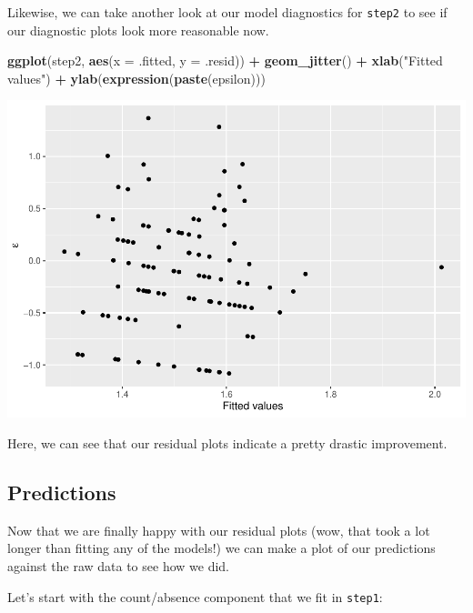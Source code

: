 \documentclass[
]{book}
\newenvironment{Shaded}{\begin{snugshade}}{\end{snugshade}}
\newcommand{\DataTypeTok}[1]{\textcolor[rgb]{0.13,0.29,0.53}{#1}}
\newcommand{\KeywordTok}[1]{\textcolor[rgb]{0.13,0.29,0.53}{\textbf{#1}}}
\newcommand{\NormalTok}[1]{#1}
\newcommand{\OperatorTok}[1]{\textcolor[rgb]{0.81,0.36,0.00}{\textbf{#1}}}
\newcommand{\StringTok}[1]{\textcolor[rgb]{0.31,0.60,0.02}{#1}}
\begin{document}
Likewise, we can take another look at our model diagnostics for \texttt{step2} to see if our diagnostic plots look more reasonable now.

\begin{Shaded}
\begin{Highlighting}[]
\KeywordTok{ggplot}\NormalTok{(step2, }\KeywordTok{aes}\NormalTok{(}\DataTypeTok{x =}\NormalTok{ .fitted, }\DataTypeTok{y =}\NormalTok{ .resid)) }\OperatorTok{+}
\StringTok{  }\KeywordTok{geom_jitter}\NormalTok{() }\OperatorTok{+}
\StringTok{  }\KeywordTok{xlab}\NormalTok{(}\StringTok{"Fitted values"}\NormalTok{) }\OperatorTok{+}
\StringTok{  }\KeywordTok{ylab}\NormalTok{(}\KeywordTok{expression}\NormalTok{(}\KeywordTok{paste}\NormalTok{(epsilon)))}
\end{Highlighting}
\end{Shaded}

\includegraphics{worstr_files/figure-latex/unnamed-chunk-362-1.pdf}

Here, we can see that our residual plots indicate a pretty drastic improvement.

\hypertarget{predict-counts}{%
\subsection{Predictions}\label{predict-counts}}

Now that we are finally happy with our residual plots (wow, that took a lot longer than fitting any of the models!) we can make a plot of our predictions against the raw data to see how we did.

Let's start with the count/absence component that we fit in \texttt{step1}:
\end{document}

